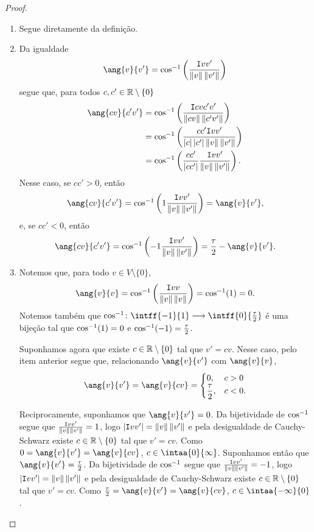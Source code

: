 \begin{proof}
	\begin{enumerate}
	\item Segue diretamente da definição.
	\item Da igualdade
	\begin{equation*}
	\ang{v}{v'} = \cos\inv\left(\frac{\inte{v}{v'}}{\nor{v}\nor{v'}}\right)
	\end{equation*}
segue que, para todos $c,c' \in \mathbb{R}\setminus\{0\}$
	\begin{align*}
	\ang{cv}{c'v'} &= \cos\inv\left(\frac{\inte{cv}{c'v'}}{\nor{cv}\nor{c'v'}}\right) \\
		&= \cos\inv\left(\frac{cc'\inte{v}{v'}}{\abs{c}\abs{c'}\nor{v}\nor{v'}}\right) \\
		&= \cos\inv\left(\frac{cc'}{\abs{cc'}}\frac{\inte{v}{v'}}{\nor{v}\nor{v'}}\right).
	\end{align*}
Nesse caso, se $cc' > 0$, então
	\begin{equation*}
	\ang{cv}{c'v'} = \cos\inv\left(1\frac{\inte{v}{v'}}{\nor{v}\nor{v'}}\right) = \ang{v}{v'},
	\end{equation*}
e, se $cc' < 0$, então
	\begin{equation*}
	\ang{cv}{c'v'} = \cos\inv\left(-1\frac{\inte{v}{v'}}{\nor{v}\nor{v'}}\right) = \frac{\tau}{2} - \ang{v}{v'}.
	\end{equation*}
	
	\item Notemos que, para todo $v \in V \setminus \{0\}$,
		\begin{equation*}
			\ang{v}{v} = \cos\inv\left(\frac{\inte{v}{v}}{\nor{v}\nor{v}}\right) = \cos\inv(1) = 0.
		\end{equation*}
Notemos também que $\cos\inv\colon \intff{-1}{1} \to \intff{0}{\frac{\tau}{2}}$ é uma bijeção tal que $\cos^{-1}(1)=0$ e $\cos^{-1}(-1) = \frac{\tau}{2}$.

Suponhamos agora que existe $c \in \mathbb{R} \setminus \{0\}$ tal que $v'=cv$. Nesse caso, pelo item anterior segue que, relacionando $\ang{v}{v'}$ com $\ang{v}{v}$,
		\begin{equation*}
		\ang{v}{v'} = \ang{v}{cv} = \begin{cases}
		0,& c>0 \\
		\displaystyle\frac{\tau}{2},& c<0.
	\end{cases}
		\end{equation*}

Reciprocamente, suponhamos que $\ang{v}{v'}=0$. Da bijetividade de $\cos^{-1}$ segue que $\frac{\mathtt I{v}{v'}}{\left\Vert{v}\right\Vert\left\Vert{v'}\right\Vert} = 1$, logo $\left\vert{\mathtt I{v}{v'}}\right\vert = \left\Vert{v}\right\Vert\left\Vert{v'}\right\Vert$ e pela desigualdade de Cauchy-Schwarz existe $c \in \mathbb{R} \setminus \{0\}$ tal que $v'=cv$. Como $0 = \ang{v}{v'} = \ang{v}{cv}$, $c \in \intaa{0}{\infty}$. Suponhamos então que $\ang{v}{v'}=\frac{\tau}{2}$. Da bijetividade de $\cos^{-1}$ segue que $\frac{\mathtt I{v}{v'}}{\left\Vert{v}\right\Vert\left\Vert{v'}\right\Vert} = -1$, logo $\left\vert{\mathtt I{v}{v'}}\right\vert = \left\Vert{v}\right\Vert\left\Vert{v'}\right\Vert$ e pela desigualdade de Cauchy-Schwarz existe $c \in \mathbb{R} \setminus \{0\}$ tal que $v'=cv$. Como $\frac{\tau}{2} = \ang{v}{v'} = \ang{v}{cv}$, $c \in \intaa{-\infty}{0}$.


\end{enumerate}
\end{proof}
